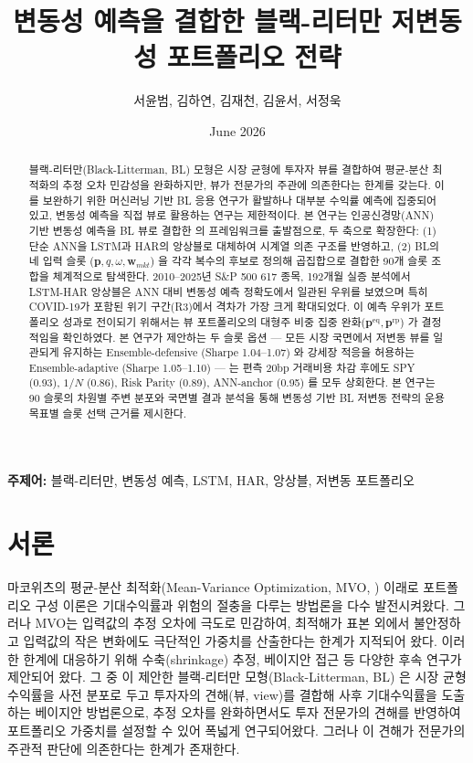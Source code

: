 \documentclass{article}
\title{변동성 예측을 결합한 블랙-리터만 저변동성 포트폴리오 전략}
\author{서윤범, 김하연, 김재천, 김윤서, 서정욱}
\date{June 2026}
\begin{document}
\maketitle

\begin{abstract}
    블랙-리터만(Black-Litterman, BL) 모형은 시장 균형에 투자자 뷰를 결합하여 평균-분산 최적화의 추정 오차 민감성을 완화하지만, 뷰가 전문가의 주관에 의존한다는 한계를 갖는다. 이를 보완하기 위한 머신러닝 기반 BL 응용 연구가 활발하나 대부분 수익률 예측에 집중되어 있고, 변동성 예측을 직접 뷰로 활용하는 연구는 제한적이다. 본 연구는 인공신경망(ANN) 기반 변동성 예측을 BL 뷰로 결합한 \citet{pyo2018}의 프레임워크를 출발점으로, 두 축으로 확장한다: (1) 단순 ANN을 LSTM과 HAR의 앙상블로 대체하여 시계열 의존 구조를 반영하고, (2) BL의 네 입력 슬롯 ($\mathbf{p}, q, \omega, \mathbf{w}_{mkt}$) 을 각각 복수의 후보로 정의해 곱집합으로 결합한 90개 슬롯 조합을 체계적으로 탐색한다. 2010–2025년 S\&P 500 617 종목, 192개월 실증 분석에서 LSTM-HAR 앙상블은 ANN 대비 변동성 예측 정확도에서 일관된 우위를 보였으며 특히 COVID-19가 포함된 위기 구간(R3)에서 격차가 가장 크게 확대되었다. 이 예측 우위가 포트폴리오 성과로 전이되기 위해서는 뷰 포트폴리오의 대형주 비중 집중 완화($\mathbf{p}^{\mathrm{eq}}, \mathbf{p}^{\mathrm{rp}}$) 가 결정적임을 확인하였다. 본 연구가 제안하는 두 슬롯 옵션 — 모든 시장 국면에서 저변동 뷰를 일관되게 유지하는 Ensemble-defensive (Sharpe 1.04–1.07) 와 강세장 적응을 허용하는 Ensemble-adaptive (Sharpe 1.05–1.10) — 는 편측 20bp 거래비용 차감 후에도 SPY (0.93), $1/N$ (0.86), Risk Parity (0.89), ANN-anchor (0.95) 를 모두 상회한다. 본 연구는 90 슬롯의 차원별 주변 분포와 국면별 결과 분석을 통해 변동성 기반 BL 저변동 전략의 운용 목표별 슬롯 선택 근거를 제시한다.
\end{abstract}

\noindent\textbf{주제어:} 블랙-리터만, 변동성 예측, LSTM, HAR, 앙상블, 저변동 포트폴리오

\section{서론}

마코위츠의 평균-분산 최적화(Mean-Variance Optimization, MVO, \citealp{markowitz1952}) 이래로 포트폴리오 구성 이론은 기대수익률과 위험의 절충을 다루는 방법론을 다수 발전시켜왔다. 그러나 MVO는 입력값의 추정 오차에 극도로 민감하여, 최적해가 표본 외에서 불안정하고 입력값의 작은 변화에도 극단적인 가중치를 산출한다는 한계가 지적되어 왔다. 이러한 한계에 대응하기 위해 수축(shrinkage) 추정\citep{ledoitwolf2004}, 베이지안 접근 등 다양한 후속 연구가 제안되어 왔다. 그 중 \citet{black1992}이 제안한 블랙-리터만 모형(Black-Litterman, BL) 은 시장 균형 수익률을 사전 분포로 두고 투자자의 견해(뷰, view)를 결합해 사후 기대수익률을 도출하는 베이지안 방법론으로, 추정 오차를 완화하면서도 투자 전문가의 견해를 반영하여 포트폴리오 가중치를 설정할 수 있어 폭넓게 연구되어왔다. 그러나 이 견해가 전문가의 주관적 판단에 의존한다는 한계가 존재한다.
\end{document}
